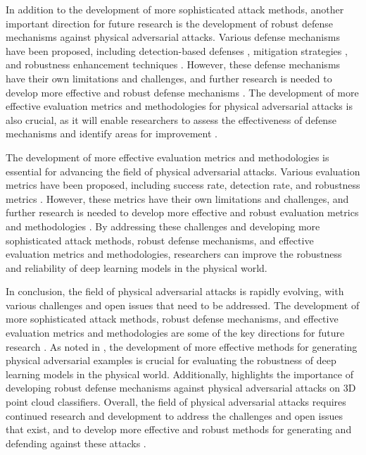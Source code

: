 \documentclass[11pt,a4paper]{article}
\begin{document}
In addition to the development of more sophisticated attack methods, another important direction for future research is the development of robust defense mechanisms against physical adversarial attacks. Various defense mechanisms have been proposed, including detection-based defenses \cite{doi:10.1109/tifs.2023.3278458}, mitigation strategies \cite{arxiv:2002.07405}, and robustness enhancement techniques \cite{arxiv:1712.02779}. However, these defense mechanisms have their own limitations and challenges, and further research is needed to develop more effective and robust defense mechanisms \cite{doi:10.1109/access.2023.3345000}. The development of more effective evaluation metrics and methodologies for physical adversarial attacks is also crucial, as it will enable researchers to assess the effectiveness of defense mechanisms and identify areas for improvement \cite{doi:10.1109/tpami.2024.3430860}.

The development of more effective evaluation metrics and methodologies is essential for advancing the field of physical adversarial attacks. Various evaluation metrics have been proposed, including success rate, detection rate, and robustness metrics \cite{doi:10.1109/tpami.2024.3430860}. However, these metrics have their own limitations and challenges, and further research is needed to develop more effective and robust evaluation metrics and methodologies \cite{arxiv:1902.10899}. By addressing these challenges and developing more sophisticated attack methods, robust defense mechanisms, and effective evaluation metrics and methodologies, researchers can improve the robustness and reliability of deep learning models in the physical world.

In conclusion, the field of physical adversarial attacks is rapidly evolving, with various challenges and open issues that need to be addressed. The development of more sophisticated attack methods, robust defense mechanisms, and effective evaluation metrics and methodologies are some of the key directions for future research \cite{doi:10.1109/tpami.2024.3430860}. As noted in \cite{doi:10.1145/3274895.3274904}, the development of more effective methods for generating physical adversarial examples is crucial for evaluating the robustness of deep learning models in the physical world. Additionally, \cite{doi:10.1109/icip.2019.8803770} highlights the importance of developing robust defense mechanisms against physical adversarial attacks on 3D point cloud classifiers. Overall, the field of physical adversarial attacks requires continued research and development to address the challenges and open issues that exist, and to develop more effective and robust methods for generating and defending against these attacks \cite{doi:10.1007/s10462-024-10841-z}.
\end{document}
